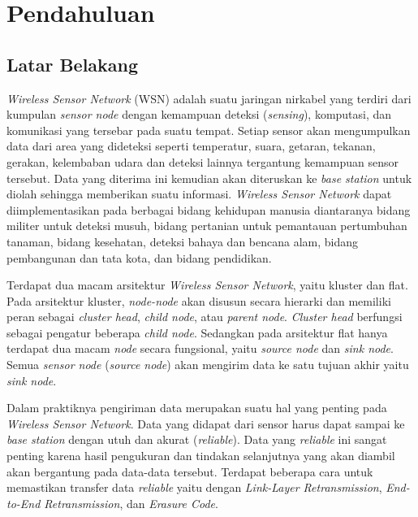 \chapter{Pendahuluan}
\label{chap:intro}
   
\section{Latar Belakang}
\label{sec:label}

\textit{Wireless Sensor Network} (WSN) adalah suatu jaringan nirkabel yang terdiri dari kumpulan \textit{sensor node} dengan kemampuan deteksi (\textit{sensing}), komputasi, dan komunikasi yang tersebar pada suatu tempat. Setiap sensor akan mengumpulkan data dari area yang dideteksi seperti temperatur, suara, getaran, tekanan, gerakan, kelembaban udara dan deteksi lainnya tergantung kemampuan sensor tersebut. Data yang diterima ini kemudian akan diteruskan ke \textit{base station} untuk diolah sehingga memberikan suatu informasi. \textit{Wireless Sensor Network} dapat diimplementasikan pada berbagai bidang kehidupan manusia diantaranya bidang militer untuk deteksi musuh, bidang pertanian untuk pemantauan pertumbuhan tanaman, bidang kesehatan, deteksi bahaya dan bencana alam, bidang pembangunan dan tata kota, dan bidang pendidikan.

Terdapat dua macam arsitektur \textit{Wireless Sensor Network}, yaitu kluster dan flat. Pada arsitektur kluster, \textit{node-node} akan disusun secara hierarki dan memiliki peran sebagai \textit{cluster head}, \textit{child node}, atau \textit{parent node}. \textit{Cluster head} berfungsi sebagai pengatur beberapa \textit{child node}. Sedangkan pada arsitektur flat hanya terdapat dua macam \textit{node} secara fungsional, yaitu \textit{source node} dan \textit{sink node}. Semua \textit{sensor node} (\textit{source node}) akan mengirim data ke satu tujuan akhir yaitu \textit{sink node}.

Dalam praktiknya pengiriman data merupakan suatu hal yang penting pada \textit{Wireless Sensor Network}. Data yang didapat dari sensor harus dapat sampai ke \textit{base station} dengan utuh dan akurat (\textit{reliable}). Data yang \textit{reliable} ini sangat penting karena hasil pengukuran dan tindakan selanjutnya yang akan diambil akan bergantung pada data-data tersebut. Terdapat beberapa cara untuk memastikan transfer data \textit{reliable} yaitu dengan \textit{Link-Layer Retransmission}, \textit{End-to-End Retransmission}, dan \textit{Erasure Code}.


